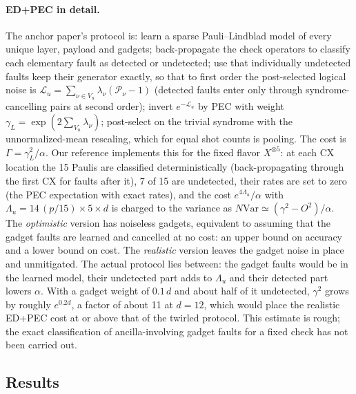 \documentclass[11pt,a4paper]{article}
\theoremstyle{remark}
\newcommand{\Var}{\mathrm{Var}}
\newcommand{\calL}{\mathcal{L}}
\newcommand{\calP}{\mathcal{P}}
\begin{document}
\paragraph{ED+PEC in detail.} The anchor paper's protocol is: learn a sparse Pauli--Lindblad model of every unique layer, payload and gadgets; back-propagate the check operators to classify each elementary fault as detected or undetected; use that individually undetected faults keep their generator exactly, so that to first order the post-selected logical noise is $\calL_u=\sum_{\nu\in V_u}\lambda_\nu(\calP_\nu-1)$ (detected faults enter only through syndrome-cancelling pairs at second order); invert $e^{-\calL_u}$ by PEC with weight $\gamma_L=\exp(2\sum_{V_u}\lambda_\nu)$; post-select on the trivial syndrome with the unnormalized-mean rescaling, which for equal shot counts is pooling. The cost is $\Gamma=\gamma_L^2/\alpha$. Our reference implements this for the fixed flavor $X^{\otimes5}$: at each CX location the 15 Paulis are classified deterministically (back-propagating through the first CX for faults after it), 7 of 15 are undetected, their rates are set to zero (the PEC expectation with exact rates), and the cost $e^{4\Lambda_u}/\alpha$ with $\Lambda_u=14\,(p/15)\times5\times d$ is charged to the variance as $N\Var\simeq(\gamma^2-O^2)/\alpha$. The \emph{optimistic} version has noiseless gadgets, equivalent to assuming that the gadget faults are learned and cancelled at no cost: an upper bound on accuracy and a lower bound on cost. The \emph{realistic} version leaves the gadget noise in place and unmitigated. The actual protocol lies between: the gadget faults would be in the learned model, their undetected part adds to $\Lambda_u$ and their detected part lowers $\alpha$. With a gadget weight of $0.1\,d$ and about half of it undetected, $\gamma^2$ grows by roughly $e^{0.2d}$, a factor of about 11 at $d=12$, which would place the realistic ED+PEC cost at or above that of the twirled protocol. This estimate is rough; the exact classification of ancilla-involving gadget faults for a fixed check has not been carried out.

\subsection{Results}
\end{document}
